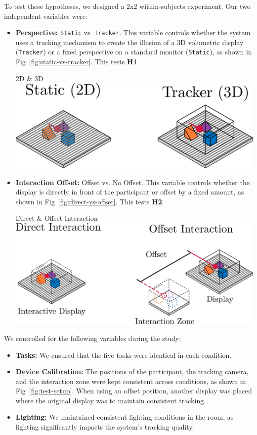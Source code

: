 To test these hypotheses, we designed a 2x2 within-subjects experiment. Our two independent variables were:
\begin{itemize}[itemsep=-0.25em]
    \item \textbf{Perspective:} \texttt{Static} vs. \texttt{Tracker}. This variable controls whether the system uses a tracking mechanism to create the illusion of a 3D volumetric display (\texttt{Tracker}) or a fixed perspective on a standard monitor (\texttt{Static}), as shown in Fig~\ref{fig:static-vs-tracker}. This tests \textbf{H1}.

    \begin{figureBox}[label={fig:static-vs-tracker}, width=0.8\linewidth]{2D \& 3D}
        \includegraphics[width=0.8\linewidth]{./implementation/figures/2D-vs-3D.pdf}
    \end{figureBox}

    \item \textbf{Interaction Offset:} Offset vs. No Offset. This variable controls whether the display is directly in front of the participant or offset by a fixed amount, as shown in Fig~\ref{fig:direct-vs-offset}. This tests \textbf{H2}.

    \begin{figureBox}[label={fig:direct-vs-offset}, width=0.8\linewidth]{Direct \& Offset Interaction}
        \includegraphics[width=0.8\linewidth]{./implementation/figures/direct-vs-offset.pdf}
    \end{figureBox}
\end{itemize}

We controlled for the following variables during the study:
\begin{itemize}
    \item \textbf{Tasks:} We ensured that the five tasks were identical in each condition.
    \item \textbf{Device Calibration:} The positions of the participant, the tracking camera, and the interaction zone were kept consistent across conditions, as shown in Fig~\ref{fig:test-setup}. When using an offset position, another display was placed where the original display was to maintain consistent tracking.
    \item \textbf{Lighting:} We maintained consistent lighting conditions in the room, as lighting significantly impacts the system's tracking quality.
\end{itemize}

